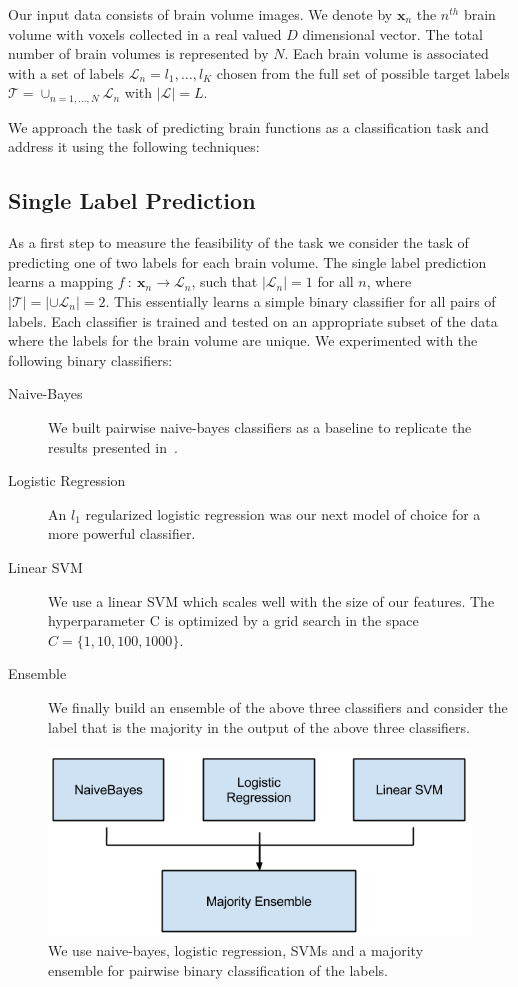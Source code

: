 \documentclass{article} %
\begin{document}
Our input data consists of brain volume images. We denote by $\mathbf{x}_n$ the $n^{th}$ brain volume with voxels collected in a real valued $D$ dimensional vector. The total number of brain volumes is represented by $N$. Each brain volume is associated with a set of labels $\mathcal{L}_n = {l_1, \ldots, l_K}$ chosen from the full set of possible target labels $\mathcal{T} = \cup_{n=1,\ldots,N} \mathcal{L}_n$ with $|\mathcal{L}|=L$.

We approach the task of predicting brain functions as a classification task and address it using the following techniques:
 \subsection{Single Label Prediction}
  As a first step to measure the feasibility of the task we consider the task of predicting one of two labels for each brain volume. The single label prediction learns a mapping $f\ :\ \mathbf{x}_n \rightarrow \mathcal{L}_n$, such that $|\mathcal{L}_n|=1$ for all $n$, where $|\mathcal{T}| =| \cup \mathcal{L}_n| = 2$. This essentially learns a simple binary classifier for all pairs of labels. Each classifier is trained and tested on an appropriate subset of the data where the labels for the brain volume are unique. We experimented with the following binary classifiers:
  \begin{description}
  \item[Naive-Bayes] We built pairwise naive-bayes classifiers as a baseline to replicate the results presented in~\cite{yarkoni2011large}.
  \item[Logistic Regression] An $l_1$ regularized logistic regression was our next model of choice for a more powerful classifier.
  \item[Linear SVM] We use a linear SVM which scales well with the size of our features. The hyperparameter C is optimized by a grid search in the space $C = \{1, 10, 100, 1000\}$.
  \item[Ensemble] We finally build an ensemble of the above three classifiers and consider the label that is the majority in the output of the above three classifiers.
  \end{description}
\begin{figure}[ht]
\vspace{-0.5cm}
\centering
\includegraphics[scale=0.5]{./figs/single_pairwise.png}
\caption{We use naive-bayes, logistic regression, SVMs and a majority ensemble for pairwise binary classification of the labels.}
\end{figure}
\end{document}
